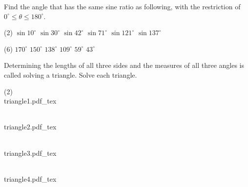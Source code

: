 \documentclass[12pt,fleqn]{book}
\newcommand{\incfig}[2][1]{%
    \def\svgwidth{#1\columnwidth}
    {#2.pdf_tex}
}
\newcommand{\prb}[1]{\begin{Exercise}\parbox[t]{\textwidth-5em}{#1}\end{Exercise}}
\newcommand{\sol}[1]{\begin{Answer}\parbox[t]{\textwidth-5em}{#1}\end{Answer}}
\begin{document}
\prb{
	Find the angle that has the same sine ratio as following, with the restriction of $0^{\circ} \leq \theta \leq 180^{\circ}$.
	\begin{tasks}(2)
		\task $\sin 10^{\circ}$
		\vspace{2em}
		\task $\sin 30^{\circ}$
		\vspace{2em}
		\task $\sin 42^{\circ}$
		\vspace{2em}
		\task $\sin 71^{\circ}$
		\vspace{2em}
		\task $\sin 121^{\circ}$
		\vspace{2em}
		\task $\sin 137^{\circ}$
		\vspace{2em}
	\end{tasks}
}
\sol{
	\begin{tasks}(6)
		\task $170^{\circ}$
		\task $150^{\circ}$
		\task $138^{\circ}$
		\task $109^{\circ}$
		\task $59^{\circ}$
		\task $43^{\circ}$
	\end{tasks}
}
\prb{
	Determining the lengths of all three sides and the measures of all three angles is called solving a triangle. Solve each triangle.
	\begin{tasks}(2)
		\task \\
		\incfig[0.8]{triangle1}
		\vspace{8em}
		\task \\
		\incfig[0.8]{triangle2}
		\vspace{8em}
		\task \\
		\incfig[0.8]{triangle3}
		\vspace{8em}
		\task \\
		\incfig[0.8]{triangle4}
		\vspace{8em}
	\end{tasks}
}
\end{document}
